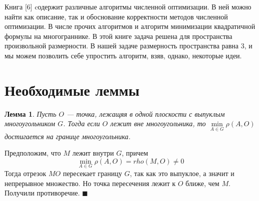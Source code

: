 \documentclass[pdftex,ptm,12pt,a4paper]{report}
\newenvironment{Proof} %
  {\par\noindent{\bf Доказательство.}} %
  {\hfill$\scriptstyle\blacksquare$}
\begin{document}
      Книга [6] cодержит различные алгоритмы численной оптимизации.
      В ней можно найти как описание, так и обоснование корректности методов численной оптимизации.
      В числе прочих алгоритмов и алгоритм минимизации квадратичной формулы на многограннике.
      В этой книге задача решена для  пространства произвольной размерности.
      В нашей задаче размерность пространства равна 3, и мы можем позволить себе упростить алгоритм, взяв, однако, некоторые идеи.

\section{Необходимые леммы}
\newtheorem{Lem}{Лемма}
\begin{Lem}\label{conv}
  Пусть $O$ --- точка, лежащяя в одной плоскости с выпуклым многоугольником $G$.
  Тогда если $O$ лежит вне многоугольника, то $\min\limits_{A \in G}\rho(A, O)$ достигается на границе многоугольника.
\end{Lem}
\begin{Proof}
  Предположим, что $M$ лежит внутри $G$, причем
  \[
    \min\limits_{A \in G}\rho(A, O) = rho(M, O) \neq 0
  \]
  Тогда отрезок $MO$ пересекает границу $G$, так как это выпуклое, а значит и непрерывное множество.
  Но точка пересечения лежит к $O$ ближе, чем $M$.
  Получили противоречие.
\end{Proof}
\end{document}
